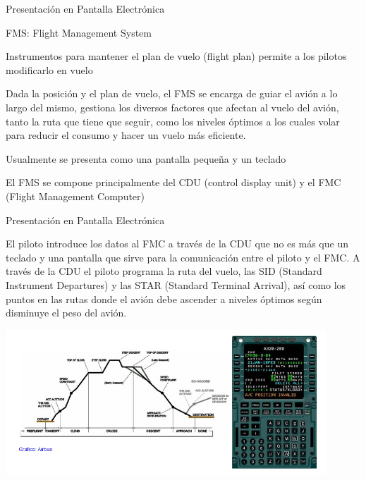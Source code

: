 \documentclass[10pt]{beamer}
\begin{document}
\begin{frame}{Presentaci\'on en Pantalla Electr\'onica}

  \begin{block} { FMS: Flight Management System}

    Instrumentos para mantener el plan de vuelo (flight plan) permite
    a los pilotos modificarlo en vuelo

    Dada la posici\'on y el plan de vuelo, el FMS se encarga de guiar
    el avi\'on a lo largo del mismo, gestiona los diversos factores
    que afectan al vuelo del avi\'on, tanto la ruta que tiene que
    seguir, como los niveles \'optimos a los cuales volar para reducir
    el consumo y hacer un vuelo m\'as eficiente.


    Usualmente se presenta como una pantalla peque\~na y un teclado

    El FMS se compone principalmente del CDU (control display unit) y
    el FMC (Flight Management Computer)
  \end{block}








\end{frame}

\begin{frame}{Presentaci\'on en Pantalla Electr\'onica}


El piloto introduce los datos al FMC a trav\'es de la CDU que no es m\'as que un teclado y una pantalla que sirve para la comunicaci\'on entre el piloto y el FMC. A trav\'es de la CDU el piloto programa la ruta del vuelo, las SID (Standard Instrument Departures) y las STAR (Standard Terminal Arrival), as\'i como los puntos en las rutas donde el avi\'on debe ascender a niveles \'optimos seg\'un disminuye el peso del avi\'on.

    \includegraphics[width=0.9\textwidth]{imagenes/1.4.pantalla.electronica/fms_plan_vuelo.jpg}
  \end{frame}
  
\end{document}
